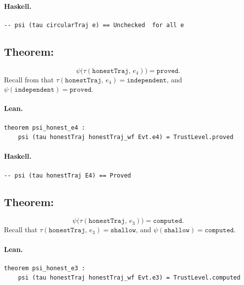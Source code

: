 \documentclass[11pt,a4paper]{article}
\begin{document}
\paragraph{Haskell.}
\begin{lstlisting}[style=haskell]
-- psi (tau circularTraj e) == Unchecked  for all e
\end{lstlisting}


\subsection{Theorem: }

\begin{thm}
\[
  \psi\bigl(\tau(\mathtt{honestTraj},\, e_4)\bigr) = \mathtt{proved}.
\]
Recall from  that $\tau(\mathtt{honestTraj},\, e_4) =
\mathtt{independent}$, and $\psi(\mathtt{independent}) = \mathtt{proved}$.
\end{thm}

\paragraph{Lean.}
\begin{lstlisting}[style=lean]
theorem psi_honest_e4 :
    psi (tau honestTraj honestTraj_wf Evt.e4) = TrustLevel.proved
\end{lstlisting}

\paragraph{Haskell.}
\begin{lstlisting}[style=haskell]
-- psi (tau honestTraj E4) == Proved
\end{lstlisting}


\subsection{Theorem: }

\begin{thm}
\[
  \psi\bigl(\tau(\mathtt{honestTraj},\, e_3)\bigr) = \mathtt{computed}.
\]
Recall that $\tau(\mathtt{honestTraj},\, e_3) = \mathtt{shallow}$, and
$\psi(\mathtt{shallow}) = \mathtt{computed}$.
\end{thm}

\paragraph{Lean.}
\begin{lstlisting}[style=lean]
theorem psi_honest_e3 :
    psi (tau honestTraj honestTraj_wf Evt.e3) = TrustLevel.computed
\end{lstlisting}
\end{document}
